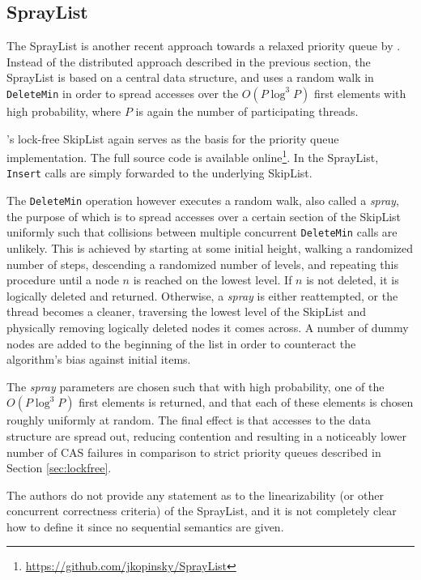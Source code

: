 \documentclass[a4paper,10pt]{article}
\begin{document}
\subsection{SprayList} \label{sec:spraylist}

The SprayList is another recent approach towards a relaxed priority queue by \citeauthor{alistarhspraylist}
\cite{alistarhspraylist}. Instead of the distributed approach described in the previous section,
the SprayList is based on a central data structure, and uses a random walk in \lstinline|DeleteMin|
in order to spread accesses over the $O(P \log^3 P)$ first elements with high probability, where $P$
is again the number of participating threads.

\citeauthor{fraser2004practical}'s lock-free SkipList \cite{fraser2004practical} again serves as the
basis for the priority queue implementation. The full source code is available online\footnote{
\url{https://github.com/jkopinsky/SprayList}}. In the SprayList, \lstinline|Insert| calls are simply
forwarded to the underlying SkipList.

The \lstinline|DeleteMin| operation however executes a random walk, also called a \emph{spray}, the
purpose of which is to spread accesses over a certain section of the SkipList uniformly such that
collisions between multiple concurrent \lstinline|DeleteMin| calls are unlikely. This is achieved by
starting at some initial height, walking a randomized number of steps, descending a randomized number of levels,
and repeating this procedure until a node $n$ is reached on the lowest level. If $n$ is not deleted,
it is logically deleted and returned. Otherwise, a \emph{spray} is either reattempted, or the thread
becomes a cleaner, traversing the lowest level of the SkipList and physically removing logically deleted
nodes it comes across. A number of dummy nodes are added to the beginning of the list in order to counteract
the algorithm's bias against initial items.

The \emph{spray} parameters are chosen such that with high probability, one of the $O(P \log^3 P)$
first elements is returned, and that each of these elements is chosen roughly uniformly at random.
The final effect is that accesses to the data structure are spread out, reducing contention and resulting
in a noticeably lower number of \ac{CAS} failures in comparison to strict priority queues described
in Section \ref{sec:lockfree}.

The authors do not provide any statement as to the linearizability (or other concurrent correctness
criteria) of the SprayList, and it is not completely clear how to define it since no
sequential semantics are given.
\end{document}
